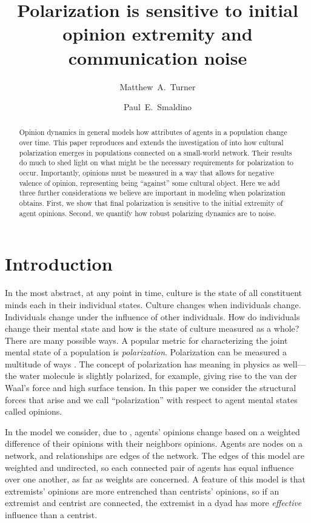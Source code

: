 \documentclass[11pt,letterpaper]{article}
\title{Polarization is sensitive to initial opinion extremity and communication noise}
\author[1]{Matthew~A.~Turner}
\author[1]{Paul~E.~Smaldino}
\affil[1]{\footnotesize Cognitive Science Program, University of California, Merced}
\date{}
\begin{document}
\maketitle

\begin{abstract}
  Opinion dynamics in general models how attributes of agents in a population
  change over time. This paper reproduces and extends the investigation of
   into how cultural polarization emerges in populations
  connected on a small-world network. Their results do much to shed light
  on what might be the necessary requirements for polarization to occur.
  Importantly, opinions must be measured in a way that allows for negative
  valence of opinion, representing being ``against'' some cultural object.
  Here we add three further considerations we believe are important in 
  modeling when polarization obtains. First, we show that final polarization
  is sensitive to the initial extremity of agent opinions. Second, we quantify
  how robust polarizing dynamics are to noise. 
\end{abstract}

\section{Introduction}


In the most abstract, at any point in time, culture is the state of all
constituent minds each in their individual states. Culture changes when 
individuals change. Individuals change under the influence of other 
individuals. How do individuals change their mental state and how is the
state of culture measured as a whole? There are many possible ways. A popular
metric for characterizing the joint mental state of a population is \emph{polarization}.
Polarization can be measured a multitude of ways \cite{Bramson2016}. The 
concept of polarization has meaning in physics as well---the water molecule
is slightly polarized, for example, giving rise to the van der Waal's force
and high surface tension. In this paper we consider the structural forces that
arise and we call ``polarization'' with respect to agent mental states called
opinions. 

In the model we consider, due to , agents' opinions
change based on a weighted difference of their opinions with their neighbors
opinions. Agents are nodes on a network, and relationships are edges of the
network. The edges of this model are weighted and undirected, so each 
connected pair of agents has equal influence over one another, as far as
weights are concerned. A feature of this model is that extremists' opinions
are more entrenched than centrists' opinions, so if an extremist and centrist
are connected, the extremist in a dyad has more \emph{effective} influence 
than a centrist. 
\end{document}
